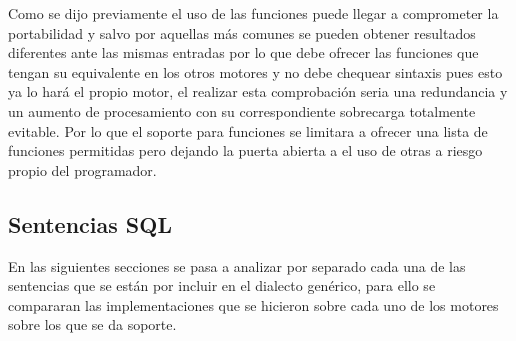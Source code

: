 Como se dijo previamente el uso de las funciones puede llegar a comprometer la portabilidad y salvo por aquellas más comunes se pueden obtener resultados diferentes ante las mismas entradas por lo que \jj debe ofrecer las funciones que tengan su equivalente en los otros motores y no debe chequear sintaxis pues esto ya lo hará el propio motor, el realizar esta comprobación seria una redundancia y un aumento de procesamiento con su correspondiente sobrecarga totalmente evitable. Por lo que el soporte para funciones se limitara a ofrecer una lista de funciones permitidas pero dejando la puerta abierta a el uso de otras a riesgo propio del programador.


\subsection{Sentencias SQL}
En las siguientes secciones se pasa a analizar por separado cada una de las sentencias que se están por incluir en el dialecto genérico, para ello se compararan las implementaciones que se hicieron sobre cada uno de los motores sobre los que se da soporte.

